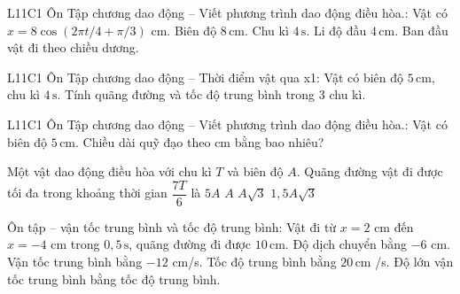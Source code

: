 \begin{ex}
L11C1 Ôn Tập chương dao động – Viết phương trình dao động điều hòa.: Vật có $x=8\cos(2\pi t/4+\pi/3)$ cm.
\choiceTF
{\True Biên độ $8\,\text{cm}$.}
{\True Chu kì $4\,\text{s}$.}
{\True Li độ đầu $4\,\text{cm}$.}
{Ban đầu vật đi theo chiều dương.}
\end{ex}

\begin{ex}
L11C1 Ôn Tập chương dao động – Thời điểm vật qua x1: Vật có biên độ $5\,\text{cm}$, chu kì $4\,\text{s}$. Tính quãng đường và tốc độ trung bình trong 3 chu kì.
\choiceTF

\end{ex}

\begin{ex}
L11C1 Ôn Tập chương dao động – Viết phương trình dao động điều hòa.: Vật có biên độ $5\,\text{cm}$. Chiều dài quỹ đạo theo cm bằng bao nhiêu?
\end{ex}

\begin{ex}
Một vật dao động điều hòa với chu kì $T$ và biên độ $A$. Quãng đường vật đi được tối đa trong khoảng thời gian $\dfrac{7T}{6}$ là
\choice
{\True $5A$}
{$A$}
{$A\sqrt{3}$}
{$1,5A\sqrt{3}$}
\end{ex}

\begin{ex}
Ôn tập – vận tốc trung bình và tốc độ trung bình: Vật đi từ $x=2$ cm đến $x=-4$ cm trong $0,5\,\text{s}$, quãng đường đi được $10\,\text{cm}$.
\choiceTF
{\True Độ dịch chuyển bằng $-6$ cm.}
{\True Vận tốc trung bình bằng $-12$ cm/s.}
{\True Tốc độ trung bình bằng $20\,\text{cm}$ /s.}
{Độ lớn vận tốc trung bình bằng tốc độ trung bình.}
\end{ex}


